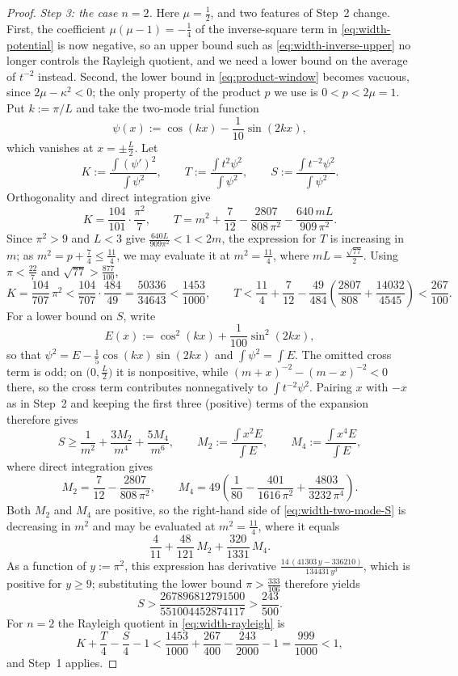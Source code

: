 \documentclass[11pt]{article}
\numberwithin{equation}{section}
\theoremstyle{definition}
\begin{document}
\begin{proof}
\emph{Step 3: the case $n=2$.} Here $\mu=\frac12$, and two features of Step~2 change. First, the coefficient $\mu(\mu-1)=-\frac14$ of the inverse-square term in \eqref{eq:width-potential} is now negative, so an upper bound such as \eqref{eq:width-inverse-upper} no longer controls the Rayleigh quotient, and we need a lower bound on the average of $t^{-2}$ instead. Second, the lower bound in \eqref{eq:product-window} becomes vacuous, since $2\mu-\kappa^2<0$; the only property of the product $p$ we use is $0<p<2\mu=1$. Put $k:=\pi/L$ and take the two-mode trial function
\[
    \psi(x):=\cos(kx)-\frac1{10}\sin(2kx),
\]
which vanishes at $x=\pm\frac L2$. Let
\[
    K:=\frac{\int(\psi')^2}{\int\psi^2},
    \qquad
    T:=\frac{\int t^2\psi^2}{\int\psi^2},
    \qquad
    S:=\frac{\int t^{-2}\psi^2}{\int\psi^2}.
\]
Orthogonality and direct integration give
\begin{equation}\label{eq:width-two-mode-KT}
    K=\frac{104}{101}\cdot\frac{\pi^2}7,
    \qquad
    T=m^2+\frac7{12}-\frac{2807}{808\,\pi^2}-\frac{640\,mL}{909\,\pi^2}.
\end{equation}
Since $\pi^2>9$ and $L<3$ give $\frac{640L}{909\pi^2}<1<2m$, the expression for $T$ is increasing in $m$; as $m^2=p+\frac74\leq\frac{11}4$, we may evaluate it at $m^2=\frac{11}4$, where $mL=\frac{\sqrt{77}}2$. Using $\pi<\frac{22}7$ and $\sqrt{77}>\frac{877}{100}$,
\[
    K=\frac{104}{707}\,\pi^2<\frac{104}{707}\cdot\frac{484}{49}=\frac{50336}{34643}<\frac{1453}{1000},
    \qquad
    T<\frac{11}4+\frac7{12}-\frac{49}{484}\left(\frac{2807}{808}+\frac{14032}{4545}\right)<\frac{267}{100}.
\]
For a lower bound on $S$, write
\[
    E(x):=\cos^2(kx)+\frac1{100}\sin^2(2kx),
\]
so that $\psi^2=E-\frac15\cos(kx)\sin(2kx)$ and $\int\psi^2=\int E$. The omitted cross term is odd; on $\bigl(0,\frac L2\bigr)$ it is nonpositive, while $(m+x)^{-2}-(m-x)^{-2}<0$ there, so the cross term contributes nonnegatively to $\int t^{-2}\psi^2$. Pairing $x$ with $-x$ as in Step~2 and keeping the first three (positive) terms of the expansion therefore gives
\begin{equation}\label{eq:width-two-mode-S}
    S\geq\frac1{m^2}+\frac{3M_2}{m^4}+\frac{5M_4}{m^6},
    \qquad
    M_2:=\frac{\int x^2E}{\int E},
    \qquad
    M_4:=\frac{\int x^4E}{\int E},
\end{equation}
where direct integration gives
\[
    M_2=\frac7{12}-\frac{2807}{808\,\pi^2},
    \qquad
    M_4=49\left(\frac1{80}-\frac{401}{1616\,\pi^2}+\frac{4803}{3232\,\pi^4}\right).
\]
Both $M_2$ and $M_4$ are positive, so the right-hand side of \eqref{eq:width-two-mode-S} is decreasing in $m^2$ and may be evaluated at $m^2=\frac{11}4$, where it equals
\[
    \frac4{11}+\frac{48}{121}\,M_2+\frac{320}{1331}\,M_4 .
\]
As a function of $y:=\pi^2$, this expression has derivative $\frac{14\,(41303\,y-336210)}{134431\,y^3}$, which is positive for $y\geq9$; substituting the lower bound $\pi>\frac{333}{106}$ therefore yields
\[
    S>\frac{267896812791500}{551004452874117}>\frac{243}{500}.
\]
For $n=2$ the Rayleigh quotient in \eqref{eq:width-rayleigh} is
\[
    K+\frac T4-\frac S4-1
    <\frac{1453}{1000}+\frac{267}{400}-\frac{243}{2000}-1
    =\frac{999}{1000}<1,
\]
and Step~1 applies.
\end{proof}
\end{document}

